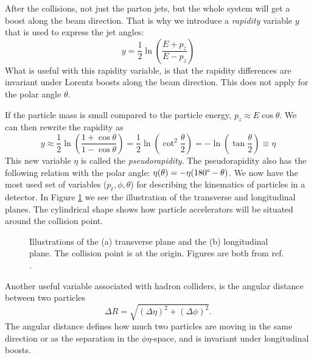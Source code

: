 \documentclass[a4paper, american, 12pt]{report}
\begin{document}
	After the collisions, not just the parton jets, but the whole system will get a boost along the beam direction. That is why we introduce a \textit{rapidity} variable $y$ that is used to express the jet angles:
	\begin{equation}
	\label{eq:Rapidity}
		y=\frac{1}{2}\ln\left(\frac{E+p_z}{E-p_z}\right)
	\end{equation}
	What is useful with this rapidity variable, is that the rapidity differences are invariant under Lorentz boosts along the beam direction. This does not apply for the polar angle $\theta$. 

	If the particle mass is small compared to the particle energy, $p_z\approx E\cos\theta$. We can then rewrite the rapidity as
	\begin{equation}
	\label{eq:Pseudorapidity}
		y\approx\frac{1}{2}\ln\left(\frac{1+\cos\theta}{1-\cos\theta}\right)=\frac{1}{2}\ln\left(\cot^2\frac{\theta}{2}\right)=-\ln\left(\tan\frac{\theta}{2}\right)\equiv\eta
	\end{equation}
	This new variable $\eta$ is called the \textit{pseudorapidity}. The pseudorapidity also has the following relation with the polar angle: $\eta(\theta)=-\eta(180\text{\textdegree}-\theta)$. We now have the most used set of variables ($p_t, \phi, \theta$) for describing the kinematics of particles in a detector. In Figure \ref{fig:Planes} we see the illustration of the transverse and longitudinal planes. The cylindrical shape shows how particle accelerators will be situated around the collision point.
	\begin{figure}[htbp!]
		\hspace*{-1.6cm}
		\caption[Collider geometry.]{Illustrations of the (a) transverse plane and the (b) longitudinal plane. The collision point is at the origin. Figures are both from ref. \cite{gramstad2013searches}. \label{fig:Planes}}
	\end{figure} 

	Another useful variable associated with hadron colliders, is the angular distance between two particles
	\begin{equation}
	\label{eq:Angular_distance}
		\Delta R=\sqrt{(\Delta \eta)^2+(\Delta \phi)^2}.
	\end{equation}
	The angular distance defines how much two particles are moving in the same direction or as the separation in the $\phi\eta$-space, and is invariant under longitudinal boosts.
\end{document}
